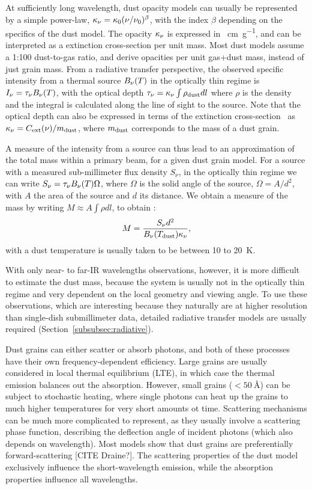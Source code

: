 At sufficiently long wavelength, dust opacity models can usually be represented by a simple power-law, $\kappa_\nu = \kappa_0(\nu/\nu_0)^\beta$, with the index $\beta$ depending on the specifics of the dust model. The opacity $\kappa_\nu$ is expressed in \si{\centi\meter\per\gram}, and can be interpreted as a extinction cross-section per unit mass. Most dust models assume a 1:100 dust-to-gas ratio, and derive opacities per unit {gas+dust} mass, instead of just grain mass. From a radiative transfer perspective, the observed specific intensity from a thermal source $B_\nu(T)$ in the optically thin regime is $I_\nu = \tau_\nu B_\nu(T)$, with the optical depth $\tau_\nu = \Knu\int{\rho_\dust dl}$ where $\rho$ is the density and the integral is calculated along the line of sight to the source. Note that the optical depth can also be expressed in terms of the extinction cross-section \Cext~as $\kappa_\nu = C_\textrm{ext}(\nu) / m_\textrm{dust}$, where $m_\textrm{dust}$ corresponds to the mass of a dust grain.

A measure of the intensity from a source can thus lead to an approximation of the total mass within a primary beam, for a given dust grain model. For a source with a measured sub-millimeter flux density $S_\nu$, in the optically thin regime we can write $S_\nu = \tau_\nu B_\nu(T)\Omega$, where $\Omega$ is the solid angle of the source, $\Omega = A/d^2$, with $A$ the area of the source and $d$ its distance. We obtain a measure of the mass by writing $M\approx A\int{\rho dl}$, to obtain \citep{Shirley:2000gh}:
\begin{equation}
M = \frac{S_\nu d^2}{B_\nu(T_\textrm{dust})\kappa_\nu},
\end{equation}
with a dust temperature is usually taken to be between 10 to \SI{20}{\kelvin}. 

With only near- to far-IR wavelengths observations, however, it is more difficult to estimate the dust mass, because the system is usually not in the optically thin regime and very dependent on the local geometry and viewing angle. To use these observations, which are interesting because they naturally are at higher resolution than single-dish submillimeter data, detailed radiative transfer models are usually required (Section~\ref{subsubsec:radiative}).


Dust grains can either scatter or absorb photons, and both of these processes have their own frequency-dependent efficiency. Large grains are usually considered in local thermal equilibrium (LTE), in which case the thermal emission balances out the absorption. However, small grains ($<\SI{50}{\angstrom}$) can be subject to stochastic heating, where single photons can heat up the grains to much higher temperatures for very short amounts ot time. Scattering mechanisms can be much more complicated to represent, as they usually involve a scattering phase function, describing the deflection angle of incident photons (which also depends on wavelength). Most models show that dust grains are preferentially forward-scattering [CITE Draine?]. The scattering properties of the dust model exclusively influence the short-wavelength emission, while the absorption properties influence all wavelengths. 

